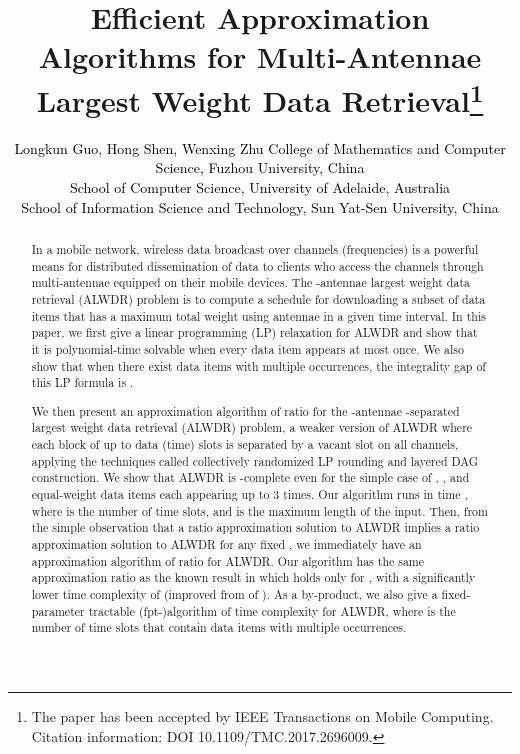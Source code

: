 \documentclass[11pt,english,onecolumn,draftcls]{IEEEtran}
\theoremstyle{plain}
\theoremstyle{plain}
\theoremstyle{plain}
\theoremstyle{plain}
\begin{document}
\title{Efficient Approximation Algorithms for Multi-Antennae Largest Weight
Data Retrieval\thanks{The paper has been accepted by IEEE Transactions on Mobile Computing.
Citation information: DOI 10.1109/TMC.2017.2696009. }}


\author{\textcolor{black}{Longkun Guo, Hong Shen, Wenxing
Zhu}\linebreak{}
\textcolor{black}{{} College of Mathematics and Computer Science,
Fuzhou University, China}\\
\textcolor{black}{{} School of Computer Science, University of
Adelaide, Australia }\\
\textcolor{black}{School of Information Science and Technology,
Sun Yat-Sen University, China}\\
}
\maketitle
\begin{abstract}
In a mobile network, wireless data broadcast over  channels (frequencies)
is a powerful means for distributed dissemination of data to clients
who access the channels through multi-antennae equipped on their mobile
devices. The -antennae largest weight data retrieval (ALWDR)
problem is to compute a schedule for downloading a subset of data
items that has a maximum total weight using  antennae in
a given time interval. In this paper, we first give a linear programming
(LP) relaxation for ALWDR and show that it is polynomial-time
solvable when every data item appears at most once. We also show that
when there exist data items with multiple occurrences, the integrality
gap of this LP formula is .

We then present an approximation algorithm of ratio 
for the -antennae -separated largest weight data
retrieval (ALWDR) problem, a weaker version of ALWDR
where each block of up to  data (time) slots is separated
by a vacant slot on all channels, applying the techniques called collectively
randomized LP rounding and layered DAG construction. We show that
ALWDR is -complete even for the simple
case of , , and equal-weight data items each appearing
up to 3 times. Our algorithm runs in time ,
where  is the number of time slots, and  is the maximum length
of the input. Then, from the simple observation that a ratio 
approximation solution to ALWDR implies a ratio
 approximation solution to ALWDR for any
fixed , we immediately have an approximation algorithm
of ratio  for ALWDR. Our algorithm
has the same approximation ratio as the known result in \cite{lu2014data}
which holds only for  , with a significantly lower time
complexity of 
(improved from 
of \cite{lu2014data}). As a by-product, we also give a fixed-parameter
tractable (fpt-)algorithm of time complexity 
for ALWDR, where  is the number of time slots that contain
data items with multiple occurrences. \end{abstract}
\end{document}

